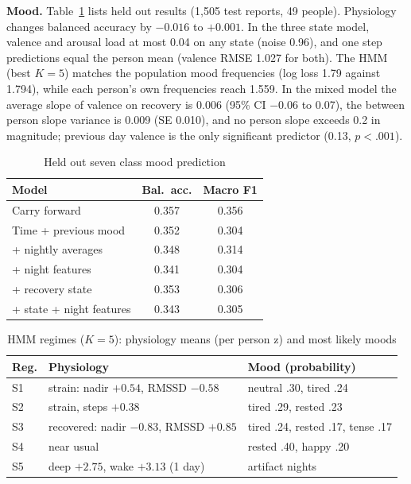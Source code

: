 \documentclass[10pt,twocolumn]{article}
\begin{document}
\textbf{Mood.} Table~\ref{tab:mood} lists held out results (1{,}505 test reports, 49 people). Physiology changes balanced accuracy by $-0.016$ to $+0.001$. In the three state model, valence and arousal load at most 0.04 on any state (noise 0.96), and one step predictions equal the person mean (valence RMSE 1.027 for both). The HMM (best $K=5$) matches the population mood frequencies (log loss 1.79 against 1.794), while each person's own frequencies reach 1.559. In the mixed model the average slope of valence on recovery is 0.006 (95\% CI $-0.06$ to 0.07), the between person slope variance is 0.009 (SE 0.010), and no person slope exceeds 0.2 in magnitude; previous day valence is the only significant predictor (0.13, $p<.001$).

\begin{table}[h]
\centering\small
\caption{Held out seven class mood prediction}
\label{tab:mood}
\begin{tabular}{lcc}\toprule
Model & Bal.\ acc. & Macro F1\\\midrule
Carry forward & 0.357 & 0.356\\
Time + previous mood & 0.352 & 0.304\\
+ nightly averages & 0.348 & 0.314\\
+ night features & 0.341 & 0.304\\
+ recovery state & 0.353 & 0.306\\
+ state + night features & 0.343 & 0.305\\\bottomrule
\end{tabular}
\end{table}


\begin{table}[h]
\centering\small
\caption{HMM regimes ($K{=}5$): physiology means (per person z) and most likely moods}
\label{tab:hmm}
\begin{tabular}{p{0.5cm}p{3.2cm}p{2.9cm}}\toprule
Reg. & Physiology & Mood (probability)\\\midrule
S1 & strain: nadir $+0.54$, RMSSD $-0.58$ & neutral .30, tired .24\\
S2 & strain, steps $+0.38$ & tired .29, rested .23\\
S3 & recovered: nadir $-0.83$, RMSSD $+0.85$ & tired .24, rested .17, tense .17\\
S4 & near usual & rested .40, happy .20\\
S5 & deep $+2.75$, wake $+3.13$ (1 day) & artifact nights\\\bottomrule
\end{tabular}
\end{table}
\end{document}
